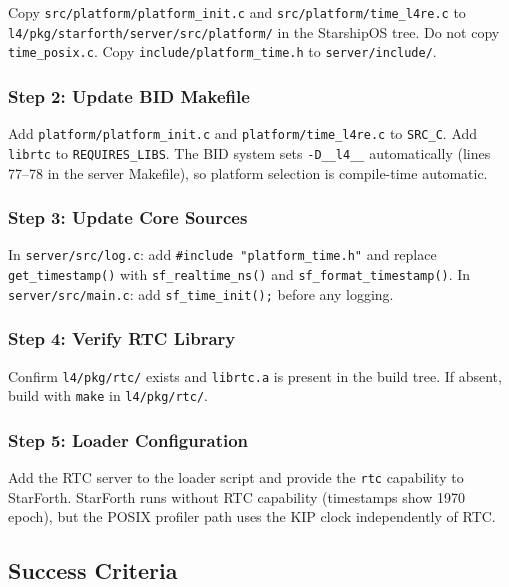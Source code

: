 Copy \texttt{src/platform/platform\_init.c} and
\texttt{src/platform/time\_l4re.c} to
\texttt{l4/pkg/starforth/server/src/platform/} in the StarshipOS tree.
Do not copy \texttt{time\_posix.c}. Copy \texttt{include/platform\_time.h}
to \texttt{server/include/}.

\subsubsection{Step 2: Update BID Makefile}

Add \texttt{platform/platform\_init.c} and \texttt{platform/time\_l4re.c}
to \texttt{SRC\_C}. Add \texttt{librtc} to \texttt{REQUIRES\_LIBS}.
The BID system sets \texttt{-D\_\_l4\_\_} automatically (lines 77--78 in
the server Makefile), so platform selection is compile-time automatic.

\subsubsection{Step 3: Update Core Sources}

In \texttt{server/src/log.c}: add \texttt{\#include
"platform\_time.h"} and replace \texttt{get\_timestamp()} with
\texttt{sf\_realtime\_ns()} and \texttt{sf\_format\_timestamp()}.
In \texttt{server/src/main.c}: add \texttt{sf\_time\_init();} before
any logging.

\subsubsection{Step 4: Verify RTC Library}

Confirm \texttt{l4/pkg/rtc/} exists and \texttt{librtc.a} is present in the
build tree. If absent, build with \texttt{make} in \texttt{l4/pkg/rtc/}.

\subsubsection{Step 5: Loader Configuration}

Add the RTC server to the loader script and provide the \texttt{rtc}
capability to StarForth. StarForth runs without RTC capability (timestamps
show 1970 epoch), but the POSIX profiler path uses the KIP clock
independently of RTC.

\subsection{Success Criteria}

